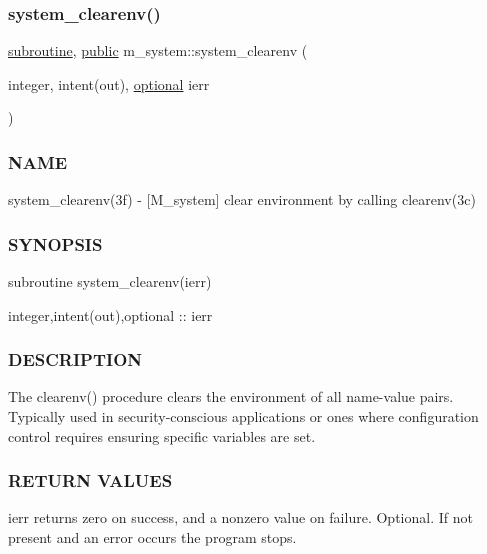 \subsubsection{\texorpdfstring{system\+\_\+clearenv()}{system\_clearenv()}}
{\footnotesize\ttfamily \hyperlink{M__stopwatch_83_8txt_acfbcff50169d691ff02d4a123ed70482}{subroutine}, \hyperlink{M__stopwatch_83_8txt_a2f74811300c361e53b430611a7d1769f}{public} m\+\_\+system\+::system\+\_\+clearenv (\begin{DoxyParamCaption}\item[{integer, intent(out), \hyperlink{option__stopwatch_83_8txt_aa4ece75e7acf58a4843f70fe18c3ade5}{optional}}]{ierr }\end{DoxyParamCaption})}



\subsubsection*{N\+A\+ME}

system\+\_\+clearenv(3f) -\/ \mbox{[}M\+\_\+system\mbox{]} clear environment by calling clearenv(3c) 

\subsubsection*{S\+Y\+N\+O\+P\+S\+IS}

\begin{DoxyVerb}subroutine system_clearenv(ierr)

 integer,intent(out),optional :: ierr
\end{DoxyVerb}


\subsubsection*{D\+E\+S\+C\+R\+I\+P\+T\+I\+ON}

The clearenv() procedure clears the environment of all name-\/value pairs. Typically used in security-\/conscious applications or ones where configuration control requires ensuring specific variables are set.

\subsubsection*{R\+E\+T\+U\+RN V\+A\+L\+U\+ES}

ierr returns zero on success, and a nonzero value on failure. Optional. If not present and an error occurs the program stops.


